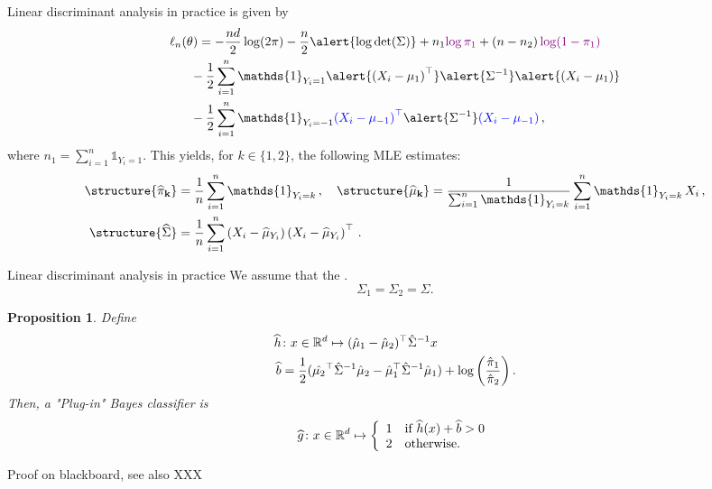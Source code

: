 \documentclass[xcolor={usenames,dvipsnames},handout]{beamer}
\newtheorem{prop}[theorem]{Proposition}
\begin{document}
\begin{frame}{Linear discriminant analysis in practice}
 is given by
\begin{align*}
\ell_n(\theta) &= - \frac{nd}{2} \log(2\pi)-\frac{n}2 \alert{\log\mathrm{\det}(\Sigma)} + n_1\textcolor{violet}{\log \pi_1} + \left(n-n_2\right)\textcolor{violet}{\log (1-\pi_{1})} \\
& \hspace{-.21cm}
-  \frac{1}{2}\sum_{i=1}^n\mathds{1}_{Y_i=1}\alert{\left(X_i - \mu_{1}\right)^\top}\alert{\Sigma^{-1}}\alert{\left(X_i - \mu_{1}\right)}\\
& \hspace{-.21cm} -  \frac{1}{2}\sum_{i=1}^n\mathds{1}_{Y_i=-1}\textcolor{blue}{\left(X_i - \mu_{-1}\right)^\top}\alert{\Sigma^{-1}}\textcolor{blue}{\left(X_i - \mu_{-1}\right)}\,,
\end{align*}
where $n_1 = \sum_{i=1}^n\mathds{1}_{Y_i=1}$. This yields, for $k\in\{1,2\}$,   the following MLE estimates:
\begin{align*}
\structure{{\bf \widehat \pi_k}} &= \frac{1}{n}\sum_{i=1}^n\mathds{1}_{Y_i=k}\,, \quad \structure{{\bf \widehat \mu_k}} = \frac{1}{\sum_{i=1}^n\mathds{1}_{Y_i=k}}\sum_{i=1}^n\mathds{1}_{Y_i=k}\,X_i\,,\\
\structure{{\widehat\Sigma}} &= \frac{1}{n}\sum_{i=1}^n \left(X_i - \widehat \mu_{Y_i}\right)\left(X_i - \widehat \mu_{Y_i}\right)^\top\,.
\end{align*}

\end{frame}

\begin{frame}{Linear discriminant analysis in practice}
	We assume that the .
	$$
		\Sigma_1 = \Sigma_2 = \Sigma.
	$$

	
	\begin{prop}
		Define 
		\begin{align*}
			\widehat{h} &\colon x \in \mathbb{R}^d \mapsto (\hat\mu_1-\hat\mu_2)^\top\hat{\Sigma}^{-1}x \\
			\widehat{b} &= \frac 12 (\hat{\mu_2}^\top\hat{\Sigma}^{-1}\hat{\mu}_2 - \hat{\mu}_1^\top\hat{\Sigma}^{-1}\hat{\mu}_1) + \log \left( \frac{\hat{\pi}_1}{\hat{\pi}_2} \right).
		\end{align*}
		Then, a "Plug-in" Bayes classifier is
		$$
			\widehat{g} \colon x \in \mathbb{R}^d \mapsto
			\left\{ \begin{array}{ll}
				1 & \text{if } \widehat{h}(x) + \widehat{b} > 0 \\
				2 & \text{otherwise}.
			\end{array} \right.
		$$
	\end{prop}

\centering
{\color{Vert} Proof on blackboard, see also XXX}

\end{frame}
\end{document}
